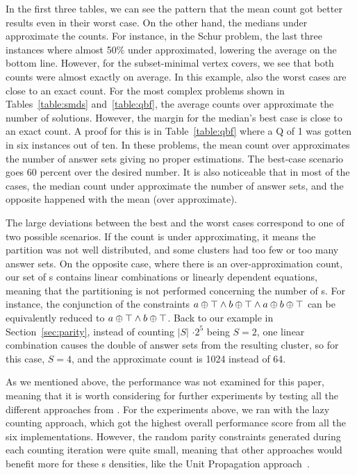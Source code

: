 In the first three tables, we can see the pattern that the mean count got better results even in their worst case.
On the other hand, the medians under approximate the counts. For instance, in the Schur problem, the last three instances where almost 50\% under approximated, lowering the average on the bottom line.
%
However, for the subset-minimal vertex covers, we see that both counts were almost exactly on average. In this example, also the worst cases are close to an exact count.
%
For the most complex problems shown in Tables~\ref{table:smds} and~\ref{table:qbf}, the average counts over approximate the number of solutions.
However, the margin for the median's best case is close to an exact count. A proof for this is in Table~\ref{table:qbf} where a Q of 1 was gotten in six instances out of ten.
In these problems, the mean count over approximates the number of answer sets giving no proper estimations. The best-case scenario goes 60 percent over the desired number.
%
It is also noticeable that in most of the cases, the median count under approximate the number of answer sets, and the opposite happened with the mean (over approximate).





The large deviations between the best and the worst cases correspond to one of two possible scenarios.
%
If the count is under approximating,
it means the partition was not well distributed, and some clusters had too few or too many answer sets. 
%
On the opposite case, where there is an over-approximation count,
our set of \XOR{}s contains linear combinations or linearly dependent equations,
meaning that the partitioning is not performed concerning the number of \XOR{}s.
% 
For instance, the conjunction of the \XOR{} constraints $a \oplus \top \land b \oplus \top \land a \oplus b \oplus \top$ can be equivalently reduced to $a \oplus \top \land b \oplus \top$. 
%
Back to our example in Section~\ref{sec:parity}, instead of counting $|S|$ $\cdot 2^5$ being $S=2$,
one linear combination causes the double of answer sets from the resulting cluster, so for this case, $S=4$, and the approximate count is 1024 instead of 64. 



As we mentioned above, the performance was not examined for this paper,
meaning that it is worth considering for further experiments by testing all the different approaches from \xorro{}.
For the experiments above, we ran \xorro{} with the lazy counting approach,
which got the highest overall performance score from all the six implementations.
However, the random parity constraints generated during each counting iteration were quite small,
meaning that other approaches would benefit more for these \XOR{}s densities, like the Unit Propagation approach~\cite{DBLP:conf/lpnmr/EverardoJKS19}.
